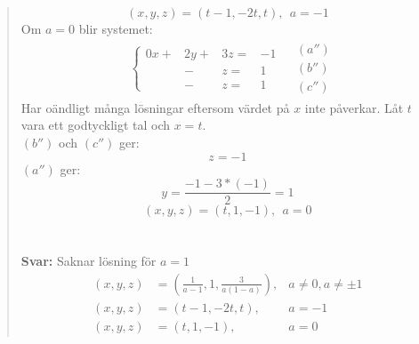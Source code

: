 \documentclass[a4paper]{article}
\begin{document}
\begin{quotation}
	\[(x,y,z)=(t-1,-2t,t),~~a=-1\]
	Om $a=0$ blir systemet:
	\begin{align*}
	&\left\{\begin{array}{rrrr}
	0x+&2y+&3z=&-1 \\
	   &  -& z=&1 \\
	   &  -& z=&1
	\end{array} \right.
	&\begin{array}{l} 
	(a'') \\ 
	(b'') \\
	(c'')
	\end{array}
	\end{align*}
	Har oändligt många lösningar eftersom värdet på $x$ inte påverkar. Låt $t$ vara ett godtyckligt tal och $x=t$.\\
	$(b'')$ och $(c'')$ ger:
	\[z=-1\]
	$(a'')$ ger:
	\[y=\frac{-1-3*(-1)}{2}=1\]
	\[(x,y,z)=(t,1,-1),~~a=0\]
	\\ \\
	\textbf{Svar:} Saknar lösning för $a=1$
		\[
		\begin{array}{rll}
		(x,y,z)&=\left(\frac{1}{a-1},1,\frac{3}{a(1-a)}\right),&a\neq0,a\neq\pm1 \\
		(x,y,z)&=(t-1,-2t,t),&a=-1 \\
		(x,y,z)&=(t,1,-1),&a=0
		\end{array}
		\]
\end{quotation}
\end{document}
